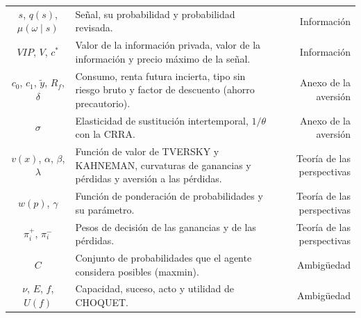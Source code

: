 \documentclass[10pt,a4paper]{article}
\begin{document}
\begin{longtable}{SMD}
$s$, $q(s)$, $\mu(\omega\mid s)$ & Señal, su probabilidad y probabilidad revisada. & Información\\
$VIP$, $V$, $c^*$ & Valor de la información privada, valor de la información y precio máximo de la señal. & Información\\
$c_0$, $c_1$, $\tilde y$, $R_f$, $\delta$ & Consumo, renta futura incierta, tipo sin riesgo bruto y factor de descuento (ahorro precautorio). & Anexo de la aversión\\
$\sigma$ & Elasticidad de sustitución intertemporal, $1/\theta$ con la CRRA. & Anexo de la aversión\\
$v(x)$, $\alpha$, $\beta$, $\lambda$ & Función de valor de TVERSKY y KAHNEMAN, curvaturas de ganancias y pérdidas y aversión a las pérdidas. & Teoría de las perspectivas\\
$w(p)$, $\gamma$ & Función de ponderación de probabilidades y su parámetro. & Teoría de las perspectivas\\
$\pi_i^+$, $\pi_i^-$ & Pesos de decisión de las ganancias y de las pérdidas. & Teoría de las perspectivas\\
$C$ & Conjunto de probabilidades que el agente considera posibles (maxmin). & Ambigüedad\\
$\nu$, $E$, $f$, $U(f)$ & Capacidad, suceso, acto y utilidad de CHOQUET. & Ambigüedad\\
\end{longtable}
\end{document}

